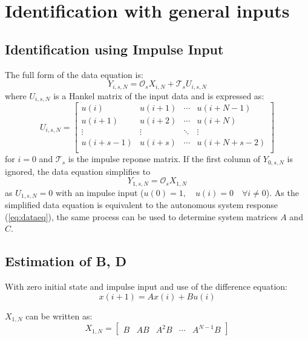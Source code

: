 \documentclass[11pt,a4paper]{article}
\begin{document}
\section{Identification with general inputs}

\subsection{Identification using Impulse Input}
The full form of the data equation is:
\begin{equation}
    \label{eq:fulldataeq}
    Y_{i, s, N} = \mathcal{O}_s X_{i, N} + \mathcal{T}_s U_{i, s, N}
\end{equation}
where $U_{i, s, N}$ is a Hankel matrix of the input data and is expressed as:
\begin{equation}
    \label{eq:uhankel}
    U_{i, s, N} =
        \begin{bmatrix}
            u(i) & u(i + 1) & \cdots & u(i + N - 1) \\
            u(i + 1) & u(i + 2) & \cdots & u(i + N) \\
            \vdots & \vdots & \ddots & \vdots \\
            u(i + s - 1) & u(i + s) & \cdots & u(i + N + s - 2) \\
        \end{bmatrix}
\end{equation}
for $i = 0$  and $\mathcal{T}_s$ is the impulse reponse matrix.
If the first column of $Y_{0, s, N}$ is ignored, the data equation simplifies
to
\begin{equation}
    \label{eq:simpdataeq}
    Y_{1, s, N} = \mathcal{O}_s X_{1, N}
\end{equation}
as $U_{1, s, N} = 0$ with an impulse input ($u(0) = 1, \quad u(i) = 0 \quad
\forall i \neq 0$).
As the simplified data equation is equivalent to the autonomous system response
(\autoref{eq:dataeq}), the same process can be used to determine system
matrices $A$ and $C$.

\subsection{Estimation of B, D}
With zero initial state and impulse input and use of the difference equation:
\begin{equation}
    \label{eq:diffeq}
    x(i + 1) = Ax(i) + Bu(i)
\end{equation}

$X_{1, N}$ can be written as:
\begin{equation}
    \label{eq:simpxhankel}
    X_{1, N} = \begin{bmatrix}
        B & AB & A^2B & \cdots & A^{N-1}B
    \end{bmatrix}
\end{equation}
\end{document}
